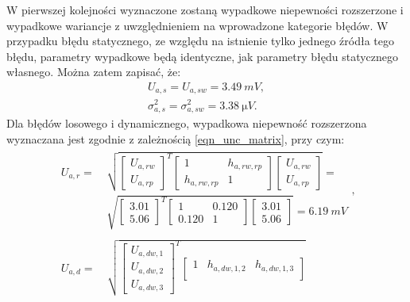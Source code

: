 W pierwszej kolejności wyznaczone zostaną wypadkowe niepewności rozszerzone i wypadkowe wariancje z uwzględnieniem na wprowadzone kategorie błędów. W przypadku błędu statycznego, ze względu na istnienie tylko jednego źródła tego błędu, parametry wypadkowe będą identyczne, jak parametry błędu statycznego własnego. Można zatem zapisać, że:
\begin{gather}
U_{a,s} = U_{a,sw} = \qty{3.49}{mV} \label{eqn_sym_parta_uncert_stat}, \\
\sigma_{a,s}^{2} = \sigma_{a,sw}^{2} = \qty{3.38}{\micro V} \label{eqn_sym_parta_var_stat}.
\end{gather}
Dla błędów losowego i dynamicznego, wypadkowa niepewność rozszerzona wyznaczana jest zgodnie z zależnością \eqref{eqn_unc_matrix}, przy czym:
\begin{gather}
\begin{split}
U_{a,r} = ~
& \sqrt{
\begin{bmatrix}
U_{a,rw} \\ U_{a,rp}
\end{bmatrix}^{T}
\begin{bmatrix}
1           & h_{a,rw,rp} \\
h_{a,rw,rp} & 1
\end{bmatrix}
\begin{bmatrix}
U_{a,rw} \\ U_{a,rp}
\end{bmatrix}} = ~ \\
& \sqrt{
\begin{bmatrix}
3.01 \\ 5.06
\end{bmatrix}^{T}
\begin{bmatrix}
1     & 0.120 \\
0.120 & 1
\end{bmatrix}
\begin{bmatrix}
3.01 \\ 5.06
\end{bmatrix}} = \qty{6.19}{mV}
\end{split}
\label{eqn_sym_parta_uncert_rand}, \\
\begin{split}
U_{a,d} = ~
& \sqrt{
\begin{bmatrix}
U_{a,dw,1} \\ U_{a,dw,2} \\ U_{a,dw,3}
\end{bmatrix}^{T}
\begin{bmatrix}
1            & h_{a,dw,1,2} & h_{a,dw,1,3} \\

\end{bmatrix}}
\end{split}
\end{gather}
